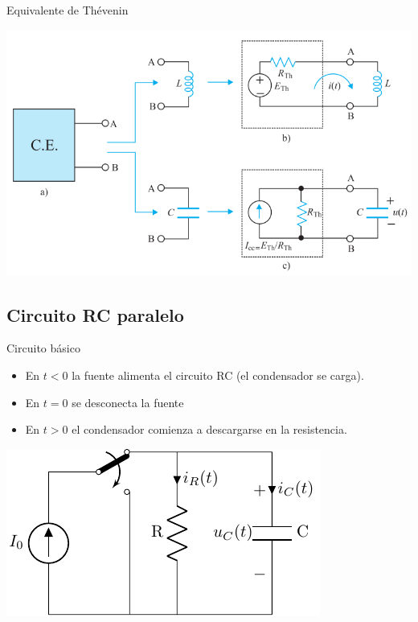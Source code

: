 \documentclass[aspectratio=169, usenames,svgnames,dvipsnames]{beamer}
\begin{document}
\begin{frame}[label={sec:org6f40344}]{Equivalente de Thévenin}
\begin{center}
\includegraphics[height=0.85\textheight]{figs/Thevenin_PrimerOrden.pdf}
\end{center}
\end{frame}
\subsection{Circuito RC paralelo}
\label{sec:orga8c227c}

\begin{frame}[label={sec:orga8bef42}]{Circuito básico}
\begin{itemize}
\item En \(t <0\) la fuente alimenta el circuito RC (el condensador se carga).
\item En \(t = 0\) se desconecta la fuente
\item En \(t > 0\) el condensador comienza a descargarse en la resistencia.
\end{itemize}

\begin{center}
\includegraphics[height=0.45\textheight]{figs/transitorio_circuitoRC.pdf}
\end{center}
\end{frame}
\end{document}
